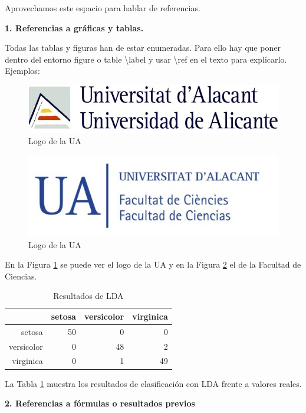 \documentclass[12pt,twoside]{article}
\begin{document}
Aprovechamos este espacio para hablar de referencias.

\textbf{1. Referencias a gráficas y tablas.}

Todas las tablas y figuras han de estar enumeradas. Para ello hay que poner dentro del entorno figure o table \textbackslash label y usar \textbackslash ref en el texto para explicarlo. Ejemplos:

\begin{figure}[h]
\centerline{\includegraphics[scale=0.5]{UA.jpg}}
\caption{Logo de la UA}\label{fig:01}
\end{figure}

\begin{figure}[h]
\centerline{\includegraphics[scale=0.5]{ciencias.jpg}}
\caption{Logo de la UA}\label{fig:02}
\end{figure}

En la Figura \ref{fig:01} se puede ver el logo de la UA y en la Figura \ref{fig:02} el de la Facultad de Ciencias.


\begin{table}[ht] 
\centering
\begin{tabular}{rrrr} 
  \hline
 & setosa & versicolor & virginica \\ 
  \hline
setosa &  50 &   0 &   0 \\ 
  versicolor &   0 &  48 &   2 \\ 
  virginica &   0 &   1 &  49 \\ 
   \hline
\end{tabular}
\caption{Resultados de LDA} \label{tab:01}
\end{table}

La Tabla \ref{tab:01} muestra los resultados de clasificación con LDA frente a valores reales.

\textbf{2. Referencias a fórmulas o resultados previos}
\end{document}
